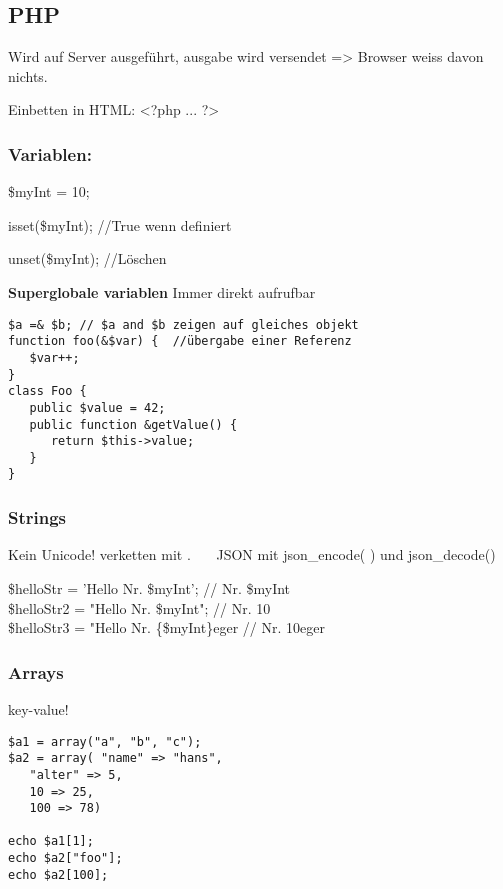 \newpage
\subsection{PHP}
Wird auf Server ausgeführt, ausgabe wird versendet => Browser weiss davon nichts.

Einbetten in HTML: <?php ... ?>
\subsubsection{Variablen:}
\$myInt = 10;

isset(\$myInt); //True wenn definiert

unset(\$myInt); //Löschen

\textbf{Superglobale variablen}
Immer direkt aufrufbar 

 
\begin{verbatim}
$a =& $b; // $a and $b zeigen auf gleiches objekt
function foo(&$var) {  //übergabe einer Referenz
   $var++;
}
class Foo {
   public $value = 42;
   public function &getValue() {
      return $this->value;
   }
}
\end{verbatim}
\subsubsection{Strings}
Kein Unicode! verketten mit .~~~ JSON mit json_encode( ) und json_decode()

\$helloStr = 'Hello Nr. \$myInt';  // Nr. \$myInt\\
\$helloStr2 = "Hello Nr. \$myInt";  // Nr. 10\\
\$helloStr3 = "Hello Nr. \{\$myInt\}eger // Nr. 10eger \newpage
\subsubsection{Arrays}
key-value!\begin{verbatim}
$a1 = array("a", "b", "c");
$a2 = array( "name" => "hans",
   "alter" => 5,
   10 => 25,
   100 => 78)

echo $a1[1];
echo $a2["foo"];
echo $a2[100];
\end{verbatim}

